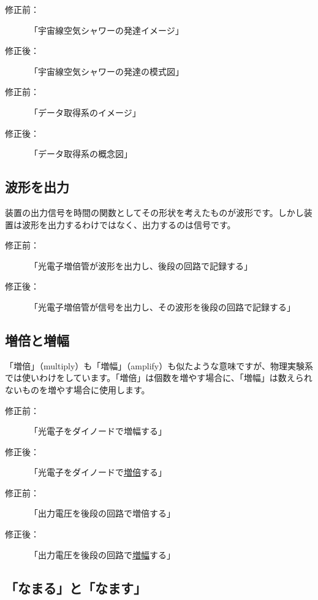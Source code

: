 \begin{description}
\item[修正前：]「宇宙線空気シャワーの発達イメージ」
\item[修正後：]「宇宙線空気シャワーの発達の模式図」
\end{description}

\begin{description}
\item[修正前：]「データ取得系のイメージ」
\item[修正後：]「データ取得系の概念図」
\end{description}

\subsection{波形を出力}

装置の出力信号を時間の関数としてその形状を考えたものが波形です。しかし装置は波形を出力するわけではなく、出力するのは信号です。

\begin{description}
\item[修正前：]「光電子増倍管が波形を出力し、後段の回路で記録する」
\item[修正後：]「光電子増倍管が信号を出力し、その波形を後段の回路で記録する」
\end{description}

\subsection{増倍と増幅}

「増倍」（multiply）も「増幅」（amplify）も似たような意味ですが、物理実験系では使いわけをしています。「増倍」は個数を増やす場合に、「増幅」は数えられないものを増やす場合に使用します。

\begin{description}
\item[修正前：]「光電子をダイノードで増幅する」
\item[修正後：]「光電子をダイノードで\underline{増倍}する」
\end{description}

\begin{description}
\item[修正前：]「出力電圧を後段の回路で増倍する」
\item[修正後：]「出力電圧を後段の回路で\underline{増幅}する」
\end{description}

\subsection{「なまる」と「なます」}

